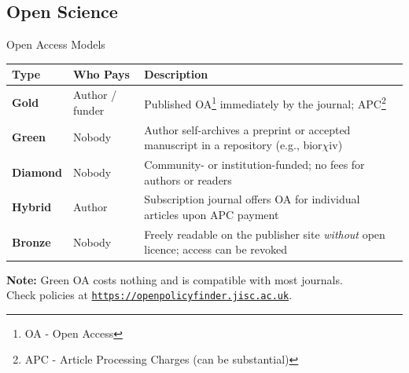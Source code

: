 \documentclass{beamer}
\begin{document}

\subsection{Open Science}

\begin{frame}{Open Access Models}

  \smallskip
  {\footnotesize
  \begin{tabular}{@{}lp{2.2cm}p{5.8cm}@{}}
    \hline
    \textbf{Type} & \textbf{Who Pays} & \textbf{Description} \\
    \hline
    \textbf{Gold}    & Author / funder   & Published OA\footnote{OA - Open Access} immediately by the journal; APC\footnote{APC - Article Processing Charges (can be substantial)} \\
    \textbf{Green}   & Nobody            & Author self-archives a preprint or accepted manuscript in a repository (e.g., bior$\chi$iv) \\
    \textbf{Diamond} & Nobody            & Community- or institution-funded; no fees for authors or readers \\
    \textbf{Hybrid}  & Author            & Subscription journal offers OA for individual articles upon APC payment \\
    \textbf{Bronze}  & Nobody            & Freely readable on the publisher site \emph{without} open licence; access can be revoked \\
    \hline
  \end{tabular}
  }

  \medskip
  \small
  \textbf{Note:} Green OA costs nothing and is compatible with most journals.\\
  Check policies at \href{https://openpolicyfinder.jisc.ac.uk}{\texttt{https://openpolicyfinder.jisc.ac.uk}}.

\end{frame}
\end{document}
